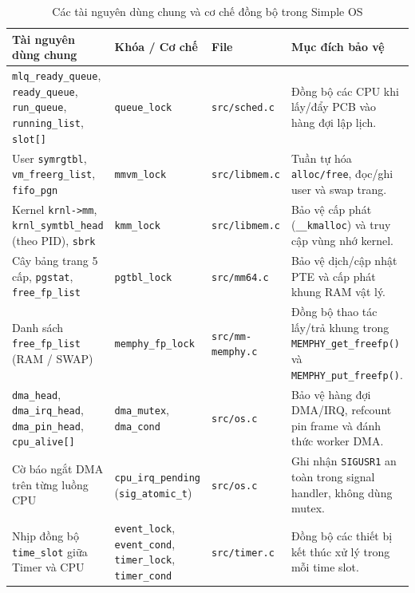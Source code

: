 \documentclass[12pt,a4paper]{article}
\begin{document}
	\begin{table}[H]
	\centering
	\footnotesize
	\setlength{\tabcolsep}{4pt}
	\renewcommand{\arraystretch}{1.15}
	\begin{tabularx}{\linewidth}{| >{\raggedright\arraybackslash}p{4.0cm} | >{\raggedright\arraybackslash}p{3.3cm} | >{\raggedright\arraybackslash}p{2.3cm} | >{\raggedright\arraybackslash}X |}
	\hline
	\textbf{Tài nguyên dùng chung} & \textbf{Khóa / Cơ chế} & \textbf{File} & \textbf{Mục đích bảo vệ} \\
	\hline
	\texttt{mlq\_ready\_queue}, \texttt{ready\_queue}, \texttt{run\_queue}, \texttt{running\_list}, \texttt{slot[]} & \texttt{queue\_lock} & \texttt{src/sched.c} & Đồng bộ các CPU khi lấy/đẩy PCB vào hàng đợi lập lịch. \\
	\hline
	User \texttt{symrgtbl}, \texttt{vm\_freerg\_list}, \texttt{fifo\_pgn} & \texttt{mmvm\_lock} & \texttt{src/libmem.c} & Tuần tự hóa \texttt{alloc/free}, đọc/ghi user và swap trang. \\
	\hline
	Kernel \texttt{krnl->mm}, \texttt{krnl\_symtbl\_head} (theo PID), \texttt{sbrk} & \texttt{kmm\_lock} & \texttt{src/libmem.c} & Bảo vệ cấp phát (\texttt{\_\_kmalloc}) và truy cập vùng nhớ kernel. \\
	\hline
	Cây bảng trang 5 cấp, \texttt{pgstat}, \texttt{free\_fp\_list} & \texttt{pgtbl\_lock} & \texttt{src/mm64.c} & Bảo vệ dịch/cập nhật PTE và cấp phát khung RAM vật lý. \\
	\hline
	Danh sách \texttt{free\_fp\_list} (RAM / SWAP) & \texttt{memphy\_fp\_lock} & \texttt{src/\allowbreak mm-memphy.c} & Đồng bộ thao tác lấy/trả khung trong \texttt{MEMPHY\_get\_\allowbreak freefp()} và \texttt{MEMPHY\_put\_\allowbreak freefp()}. \\
	\hline
	\texttt{dma\_head}, \texttt{dma\_irq\_head}, \texttt{dma\_pin\_head}, \texttt{cpu\_alive[]} & \texttt{dma\_mutex}, \texttt{dma\_cond} & \texttt{src/os.c} & Bảo vệ hàng đợi DMA/IRQ, refcount pin frame và đánh thức worker DMA. \\
	\hline
	Cờ báo ngắt DMA trên từng luồng CPU & \texttt{cpu\_irq\_pending} (\texttt{sig\_atomic\_t}) & \texttt{src/os.c} & Ghi nhận \texttt{SIGUSR1} an toàn trong signal handler, không dùng mutex. \\
	\hline
	Nhịp đồng bộ \texttt{time\_slot} giữa Timer và CPU & \texttt{event\_lock}, \texttt{event\_cond}, \texttt{timer\_lock}, \texttt{timer\_cond} & \texttt{src/timer.c} & Đồng bộ các thiết bị kết thúc xử lý trong mỗi time slot. \\
	\hline
	\end{tabularx}
	\caption{Các tài nguyên dùng chung và cơ chế đồng bộ trong Simple OS}
	\label{tab:sync_locks}
	\end{table}
\end{document}

